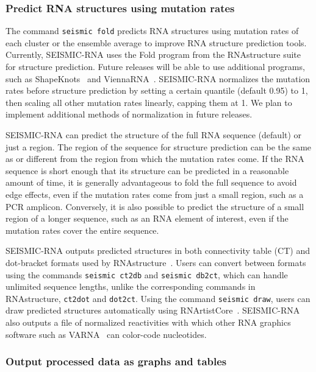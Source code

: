 \documentclass[11pt]{article}
\begin{document}
\subsubsection{Predict RNA structures using mutation rates}

The command \verb|seismic fold| predicts RNA structures using mutation rates of each cluster or the ensemble average to improve RNA structure prediction tools.
Currently, SEISMIC-RNA uses the Fold program from the RNAstructure suite~\cite{Reuter2010} for structure prediction.
Future releases will be able to use additional programs, such as ShapeKnots~\cite{Hajdin2013} and ViennaRNA~\cite{Lorenz2011}.
SEISMIC-RNA normalizes the mutation rates before structure prediction by setting a certain quantile (default 0.95) to 1, then scaling all other mutation rates linearly, capping them at 1.
We plan to implement additional methods of normalization in future releases.

SEISMIC-RNA can predict the structure of the full RNA sequence (default) or just a region.
The region of the sequence for structure prediction can be the same as or different from the region from which the mutation rates come.
If the RNA sequence is short enough that its structure can be predicted in a reasonable amount of time, it is generally advantageous to fold the full sequence to avoid edge effects, even if the mutation rates come from just a small region, such as a PCR amplicon.
Conversely, it is also possible to predict the structure of a small region of a longer sequence, such as an RNA element of interest, even if the mutation rates cover the entire sequence.

SEISMIC-RNA outputs predicted structures in both connectivity table (CT) and dot-bracket formats used by RNAstructure~\cite{Reuter2010}.
Users can convert between formats using the commands \verb|seismic ct2db| and \verb|seismic db2ct|, which can handle unlimited sequence lengths, unlike the corresponding commands in RNAstructure, \verb|ct2dot| and \verb|dot2ct|.
Using the command \verb|seismic draw|, users can draw predicted structures automatically using RNArtistCore~\cite{RNArtistCore}.
SEISMIC-RNA also outputs a file of normalized reactivities with which other RNA graphics software such as VARNA~\cite{Darty2009} can color-code nucleotides.

\subsubsection{Output processed data as graphs and tables}
\end{document}
